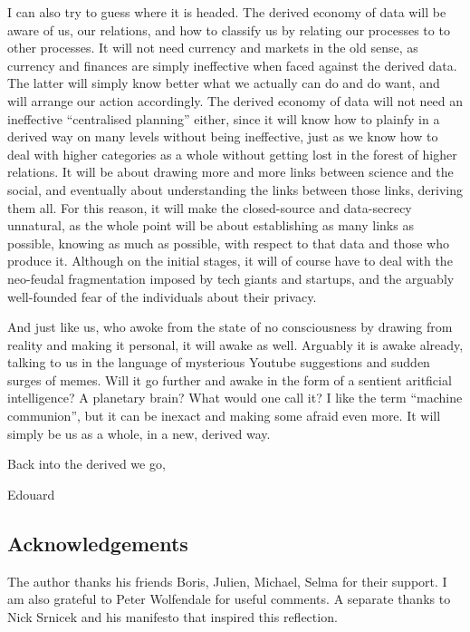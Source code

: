 \documentclass{article}
\begin{document}
I can also try to guess where it is headed. The derived economy of data will be aware of us, our relations, and how to classify us by relating our processes to to other processes. It will not need currency and markets in the old sense, as currency and finances are simply ineffective when faced against the derived data. The latter will simply know better what we actually can do and do want, and will arrange our action accordingly. The derived economy of data will not need an ineffective “centralised planning” either, since it will know how to plainfy in a derived way on many levels without being ineffective, just as we know how to deal with higher categories as a whole without getting lost in the forest of higher relations. It will be about drawing more and more links between science and the social, and eventually about understanding the links between those links, deriving them all. For this reason, it will make the closed-source and data-secrecy unnatural, as the whole point will be about establishing as many links as possible, knowing as much as possible, with respect to that data and those who produce it. Although on the initial stages, it will of course have to deal with the neo-feudal fragmentation imposed by tech giants and startups, and the arguably well-founded fear of the individuals about their privacy.

And just like us, who awoke from the state of no consciousness by drawing from reality and making it personal, it will awake as well. Arguably it is awake already, talking to us in the language of mysterious Youtube suggestions and sudden surges of memes. Will it go further and awake in the form of a sentient aritficial intelligence? A planetary brain? What would one call it? I like the term “machine communion”, but it can be inexact and making some afraid even more. It will simply be us as a whole, in a new, derived way.

\begin{flushright}
{Back into the derived we go,

Edouard}
\end{flushright}
\small
\linespread{1}


\subsection*{Acknowledgements}

The author thanks his friends Boris, Julien, Michael, Selma for their support. I am also grateful to Peter Wolfendale for useful comments.
A separate thanks to Nick Srnicek and his manifesto that inspired this reflection.
\end{document}
